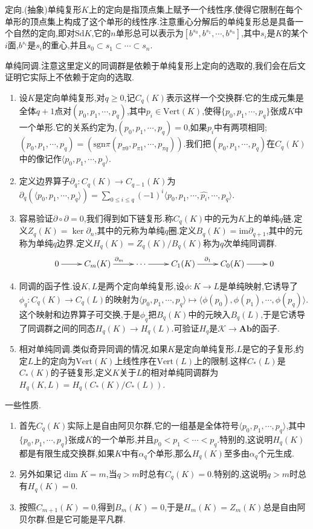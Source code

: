 定向.(抽象)单纯复形$K$上的定向是指顶点集上赋予一个线性序,使得它限制在每个单形的顶点集上构成了这个单形的线性序.注意重心分解后的单纯复形总是具备一个自然的定向,即对$\mathrm{Sd}K$,它的$n$单形总可以表示为$[b^{s_0},b^{s_1},\cdots,b^{s_n}]$,其中$s_i$是$K$的某个$i$面,$b^{s_i}$是$s_i$的重心,并且$s_0\subset s_1\subset\cdots\subset s_n$.

单纯同调.注意这里定义的同调群是依赖于单纯复形上定向的选取的,我们会在后文证明它实际上不依赖于定向的选取.
\begin{enumerate}
	\item 设$K$是定向单纯复形,对$q\ge0$,记$C_q(K)$表示这样一个交换群:它的生成元集是全体$q+1$点对$(p_0,p_1,\cdots,p_q)$,其中$p_i\in\mathrm{Vert}(K)$,使得$\{p_0,p_1,\cdots,p_q\}$张成$K$中一个单形.它的关系约定为,$(p_0,p_1,\cdots,p_q)=0$,如果$p_i$中有两项相同;$(p_0,p_1,\cdots,p_q)=(\mathrm{sgn}\pi(p_{\pi0},p_{\pi1},\cdots,p_{\pi q}))$.我们把$(p_0,p_1,\cdots,p_q)$在$C_q(K)$中的像记作$\langle p_0,p_1,\cdots,p_q\rangle$.
	\item 定义边界算子$\partial_q:C_q(K)\to C_{q-1}(K)$为$\partial_q(\langle p_0,p_1,\cdots,p_q\rangle)=\sum_{0\le i\le q}(-1)^i\langle p_0,p_1,\cdots,\hat{p_i},\cdots,p_q\rangle$.
	\item 容易验证$\partial\circ\partial=0$,我们得到如下链复形.称$C_q(K)$中的元为$K$上的单纯$q$链.定义$Z_q(K)=\ker\partial_n$,其中的元称为单纯$q$圈.定义$B_q(K)=\mathrm{im}\partial_{q+1}$,其中的元称为单纯$q$边界.定义$H_q(K)=Z_q(K)/B_q(K)$称为$q$次单纯同调群.
	$$\xymatrix{0\ar[r]&C_m(K)\ar[r]^{\partial_m}&\cdots\ar[r]&C_1(K)\ar[r]^{\partial_1}&C_0(K)\ar[r]&0}$$
	\item 同调的函子性.设$K,L$是两个定向单纯复形,设$\phi:K\to L$是单纯映射,它诱导了$\phi_q:C_q(K)\to C_q(L)$的映射为$\langle p_0,p_1,\cdots,p_q\rangle\mapsto\langle\phi(p_0),\phi(p_1),\cdots,\phi(p_q)\rangle$.这个映射和边界算子可交换,于是$\phi_q$把$B_q(K)$中的元映入$B_q(L)$,于是它诱导了同调群之间的同态$H_q(K)\to H_q(L)$.可验证$H_q$是$\mathscr{K}\to\textbf{Ab}$的函子.
	\item 相对单纯同调.类似奇异同调的情况,如果$K$是定向单纯复形,$L$是它的子复形,约定$L$上的定向为$\mathrm{Vert}(K)$上线性序在$\mathrm{Vert}(L)$上的限制.这样$C_*(L)$是$C_*(K)$的子链复形,定义$K$关于$L$的相对单纯同调群为$H_q(K,L)=H_q(C_*(K)/C_*(L))$.
\end{enumerate}

一些性质.
\begin{enumerate}
	\item 首先$C_q(K)$实际上是自由阿贝尔群,它的一组基是全体符号$\langle p_0,p_1,\cdots,p_q\rangle$,其中$\{p_0,p_1,\cdots,p_q\}$张成$K$的一个单形,并且$p_0<p_1<\cdots<p_q$.特别的,这说明$H_q(K)$都是有限生成交换群,如果$K$中有$\alpha_q$个单形,那么$H_q(K)$至多由$\alpha_q$个元生成.
	\item 另外如果记$\dim K=m$,当$q>m$时总有$C_q(K)=0$.特别的,这说明$q>m$时总有$H_q(K)=0$.
	\item 按照$C_{m+1}(K)=0$,得到$B_m(K)=0$,于是$H_m(K)=Z_m(K)$总是自由阿贝尔群.但是它可能是平凡群.
\end{enumerate}

